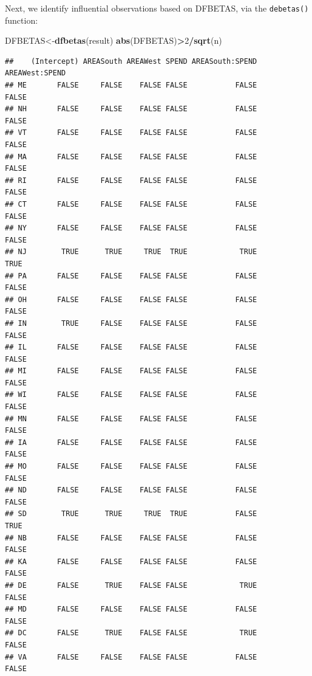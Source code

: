 \documentclass[
]{book}
\newenvironment{Shaded}{\begin{snugshade}}{\end{snugshade}}
\newcommand{\DecValTok}[1]{\textcolor[rgb]{0.00,0.00,0.81}{#1}}
\newcommand{\FunctionTok}[1]{\textcolor[rgb]{0.13,0.29,0.53}{\textbf{#1}}}
\newcommand{\NormalTok}[1]{#1}
\newcommand{\OtherTok}[1]{\textcolor[rgb]{0.56,0.35,0.01}{#1}}
\newcommand{\SpecialCharTok}[1]{\textcolor[rgb]{0.81,0.36,0.00}{\textbf{#1}}}
\begin{document}
Next, we identify influential observations based on DFBETAS, via the \texttt{debetas()} function:

\begin{Shaded}
\begin{Highlighting}[]
\NormalTok{DFBETAS}\OtherTok{\textless{}{-}}\FunctionTok{dfbetas}\NormalTok{(result)}
\FunctionTok{abs}\NormalTok{(DFBETAS)}\SpecialCharTok{\textgreater{}}\DecValTok{2}\SpecialCharTok{/}\FunctionTok{sqrt}\NormalTok{(n)}
\end{Highlighting}
\end{Shaded}

\begin{verbatim}
##    (Intercept) AREASouth AREAWest SPEND AREASouth:SPEND AREAWest:SPEND
## ME       FALSE     FALSE    FALSE FALSE           FALSE          FALSE
## NH       FALSE     FALSE    FALSE FALSE           FALSE          FALSE
## VT       FALSE     FALSE    FALSE FALSE           FALSE          FALSE
## MA       FALSE     FALSE    FALSE FALSE           FALSE          FALSE
## RI       FALSE     FALSE    FALSE FALSE           FALSE          FALSE
## CT       FALSE     FALSE    FALSE FALSE           FALSE          FALSE
## NY       FALSE     FALSE    FALSE FALSE           FALSE          FALSE
## NJ        TRUE      TRUE     TRUE  TRUE            TRUE           TRUE
## PA       FALSE     FALSE    FALSE FALSE           FALSE          FALSE
## OH       FALSE     FALSE    FALSE FALSE           FALSE          FALSE
## IN        TRUE     FALSE    FALSE FALSE           FALSE          FALSE
## IL       FALSE     FALSE    FALSE FALSE           FALSE          FALSE
## MI       FALSE     FALSE    FALSE FALSE           FALSE          FALSE
## WI       FALSE     FALSE    FALSE FALSE           FALSE          FALSE
## MN       FALSE     FALSE    FALSE FALSE           FALSE          FALSE
## IA       FALSE     FALSE    FALSE FALSE           FALSE          FALSE
## MO       FALSE     FALSE    FALSE FALSE           FALSE          FALSE
## ND       FALSE     FALSE    FALSE FALSE           FALSE          FALSE
## SD        TRUE      TRUE     TRUE  TRUE           FALSE           TRUE
## NB       FALSE     FALSE    FALSE FALSE           FALSE          FALSE
## KA       FALSE     FALSE    FALSE FALSE           FALSE          FALSE
## DE       FALSE      TRUE    FALSE FALSE            TRUE          FALSE
## MD       FALSE     FALSE    FALSE FALSE           FALSE          FALSE
## DC       FALSE      TRUE    FALSE FALSE            TRUE          FALSE
## VA       FALSE     FALSE    FALSE FALSE           FALSE          FALSE

\end{verbatim}
\end{document}
